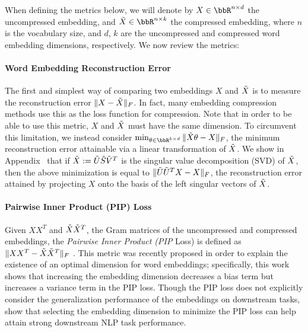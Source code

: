 When defining the metrics below, we will denote by $X \in \RR^{n\times d}$ the uncompressed embedding, and $\tX \in \RR^{n \times k}$ the compressed embedding, where $n$ is the vocabulary size, and $d$, $k$ are the uncompressed and compressed word embedding dimensions, respectively.
We now review the metrics:



\paragraph{Word Embedding Reconstruction Error}
The first and simplest way of comparing two embeddings $X$ and $\tX$ is to measure the reconstruction error $\|X-\tX\|_F$.
In fact, many embedding compression methods \citep{andrews16,dccl17} use this as the loss function for compression.
Note that in order to be able to use this metric, $X$ and $\tX$ must have the same dimension.
To circumvent this limitation, we instead consider $\min_{\theta \in \RR^{k \times d}} \|\tX \theta - X \|_F$, the minimum reconstruction error attainable via a linear transformation of $\tX$.
We show in Appendix~ that if $\tX \defeq \tU \tS \tV^T$ is the singular value decomposition (SVD) of $\tX$, then the above minimization is equal to $\|\tU\tU^T X - X\|_F$, the reconstruction error attained by projecting $X$ onto the basis of the left singular vectors of $\tX$.

\paragraph{Pairwise Inner Product (PIP) Loss}
Given $XX^T$ and $\tX\tX^T$, the Gram matrices of the uncompressed and compressed embeddings, the \textit{Pairwise Inner Product (PIP} Loss) is defined as $\|XX^T -\tX\tX^T\|_F$ \citep{yin18}.
This metric was recently proposed in order to explain the existence of an optimal dimension for word embeddings;
specifically, this work shows that increasing the embedding dimension decreases a bias term but increases a variance term in the PIP loss.
Though the PIP loss does not explicitly consider the generalization performance of the embeddings on downstream tasks, \citet{yin18} show that selecting the embedding dimension to minimize the PIP loss can help attain strong downstream NLP task performance.

